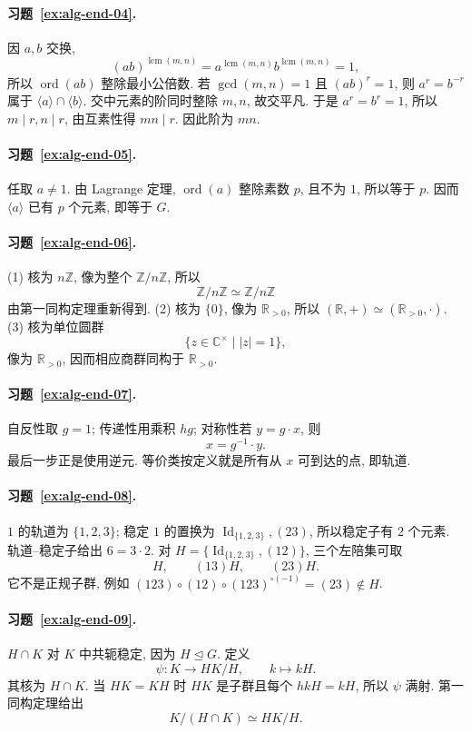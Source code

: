 \documentclass[usesamecnt, thmcnt=section, lang=cn, newtx, 10pt, scheme=chinese]{elegantbook}
\begin{document}
\paragraph*{习题~\ref{ex:alg-end-04}.}
因 $a,b$ 交换,
\[
 (ab)^{\operatorname{lcm}(m,n)}
 =a^{\operatorname{lcm}(m,n)}b^{\operatorname{lcm}(m,n)}=1,
\]
所以 $\operatorname{ord}(ab)$ 整除最小公倍数. 若 $\gcd(m,n)=1$ 且 $(ab)^r=1$, 则 $a^r=b^{-r}$ 属于 $\langle a\rangle\cap\langle b\rangle$. 交中元素的阶同时整除 $m,n$, 故交平凡. 于是 $a^r=b^r=1$, 所以 $m\mid r,n\mid r$, 由互素性得 $mn\mid r$. 因此阶为 $mn$.

\paragraph*{习题~\ref{ex:alg-end-05}.}
任取 $a\neq1$. 由 Lagrange 定理, $\operatorname{ord}(a)$ 整除素数 $p$, 且不为 $1$, 所以等于 $p$. 因而 $\langle a\rangle$ 已有 $p$ 个元素, 即等于 $G$.

\paragraph*{习题~\ref{ex:alg-end-06}.}
(1) 核为 $n\mathbb Z$, 像为整个 $\mathbb Z/n\mathbb Z$, 所以
\[
 \mathbb Z/n\mathbb Z\simeq\mathbb Z/n\mathbb Z
\]
由第一同构定理重新得到. (2) 核为 $\{0\}$, 像为 $\mathbb R_{>0}$, 所以 $(\mathbb R,+)\simeq(\mathbb R_{>0},\cdot)$. (3) 核为单位圆群
\[
 \{z\in\mathbb C^\times\mid |z|=1\},
\]
像为 $\mathbb R_{>0}$, 因而相应商群同构于 $\mathbb R_{>0}$.

\paragraph*{习题~\ref{ex:alg-end-07}.}
自反性取 $g=1$; 传递性用乘积 $hg$; 对称性若 $y=g\cdot x$, 则
\[
 x=g^{-1}\cdot y.
\]
最后一步正是使用逆元. 等价类按定义就是所有从 $x$ 可到达的点, 即轨道.

\paragraph*{习题~\ref{ex:alg-end-08}.}
$1$ 的轨道为 $\{1,2,3\}$; 稳定 $1$ 的置换为 $\operatorname{Id}_{\{1,2,3\}},(23)$, 所以稳定子有 $2$ 个元素. 轨道--稳定子给出 $6=3\cdot2$. 对 $H=\{\operatorname{Id}_{\{1,2,3\}},(12)\}$, 三个左陪集可取
\[
 H,
 \qquad
 (13)H,
 \qquad
 (23)H.
\]
它不是正规子群, 例如 $(123)\circ(12)\circ(123)^{\circ(-1)}=(23)\notin H$.

\paragraph*{习题~\ref{ex:alg-end-09}.}
$H\cap K$ 对 $K$ 中共轭稳定, 因为 $H\trianglelefteq G$. 定义
\[
 \psi:K\to HK/H,
 \qquad k\mapsto kH.
\]
其核为 $H\cap K$. 当 $HK=KH$ 时 $HK$ 是子群且每个 $hkH=kH$, 所以 $\psi$ 满射. 第一同构定理给出
\[
 K/(H\cap K)\simeq HK/H.
\]
\end{document}
